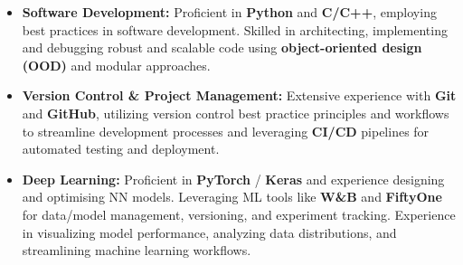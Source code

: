 \documentclass[10pt]{res}
\begin{document}
\begin{resume}



\begin{itemize} \itemsep 1pt

\item {\bf Software Development:} Proficient in \textbf{Python} and \textbf{C/C++}, employing best practices in software development. Skilled in architecting, implementing and debugging robust and scalable code using \textbf{object-oriented design (OOD)} and modular approaches.

\item {\bf Version Control \& Project Management:} Extensive experience with \textbf{Git} and \textbf{GitHub}, utilizing version control best practice principles and workflows to streamline development processes and leveraging \textbf{CI/CD} pipelines for automated testing and deployment.

\item {\bf Deep Learning:} Proficient in \textbf{PyTorch} / \textbf{Keras} and experience designing and optimising NN models. Leveraging ML tools like \textbf{W\&B} and \textbf{FiftyOne} for data/model management, versioning, and experiment tracking. Experience in visualizing model performance, analyzing data distributions, and streamlining machine learning workflows.


\end{itemize}
\end{resume}
\end{document}
